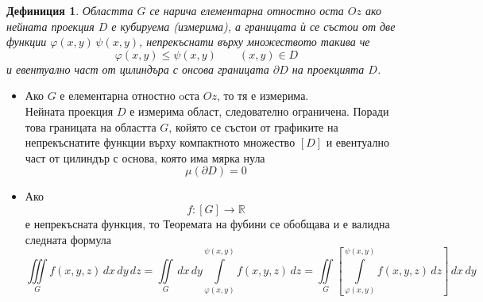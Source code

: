\documentclass[a4paper,fleqn,12pt]{article}
\newtheorem{definition}{Дефиниция}[subsection]
\theoremstyle{definition}
\begin{document}
\begin{definition}
Областта $G$ се нарича елементарна отностно оста $Oz$ ако нейната проекция $D$ е кубируема (измерима), а границата ѝ се състои от две функции $\varphi(x,y) \, \psi(x,y)$, непрекъснати върху множеството такива че 
$$\varphi(x,y) \leq \psi(x,y) \qquad (x,y) \in D$$
и евентуално част от цилиндъра с онсова границата $\partial D$ на проекцията $D$. \\
\end{definition}

\begin{itemize}
\item Ако $G$ е елементарна отностно oста $Oz$, то тя е измерима. \\
Нейната проекция $D$ е измерима област, следователно ограничена. 
Поради това границата на областта $G$, койято се състои от графиките на непрекъснатите функции върху компактното множество $[D]$ и евентуално част от цилиндър с основа, която има мярка нула
$$\mu(\partial D) = 0$$
\item Ако 
$$f: [G] \to \mathbb{R}$$
е непрекъсната функция, то Теоремата на фубини се обобщава и е валидна следната формула
$$\iiint\limits_G f(x,y,z) \, dx \, dy \, dz = \iint\limits_G \, dx \, dy \int\limits_{\varphi(x,y)} ^{\psi(x,y)} f(x,y,z) \, dz =  \iint\limits_G \left[ \int\limits_{\varphi(x,y)} ^{\psi(x,y)} f(x,y,z) \, dz  \right]\, dx \, dy $$
\end{itemize}
\end{document}

